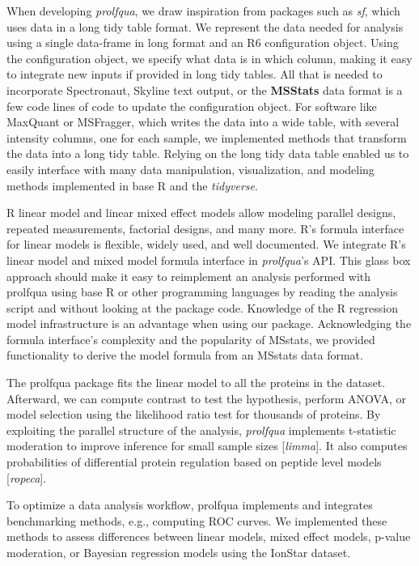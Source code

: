 \documentclass[journal=jacsat,manuscript=article]{achemso}
\begin{document}
When developing \emph{prolfqua}, we draw inspiration from packages such
as \emph{sf}, which uses data in a long tidy table format. We represent
the data needed for analysis using a single data-frame in long format
and an R6 configuration object. Using the configuration object, we
specify what data is in which column, making it easy to integrate new
inputs if provided in long tidy tables. All that is needed to
incorporate Spectronaut, Skyline text output, or the \textbf{MSStats}
data format is a few code lines of code to update the configuration
object. For software like MaxQuant or MSFragger, which writes the data
into a wide table, with several intensity columns, one for each sample,
we implemented methods that transform the data into a long tidy table.
Relying on the long tidy data table enabled us to easily interface with
many data manipulation, visualization, and modeling methods implemented
in base R and the \emph{tidyverse}.

R linear model and linear mixed effect models allow modeling parallel
designs, repeated measurements, factorial designs, and many more. R's
formula interface for linear models is flexible, widely used, and well
documented. We integrate R's linear model and mixed model formula
interface in \emph{prolfqua}'s API. This glass box approach should make
it easy to reimplement an analysis performed with prolfqua using base R
or other programming languages by reading the analysis script and
without looking at the package code. Knowledge of the R regression model
infrastructure is an advantage when using our package. Acknowledging the
formula interface's complexity and the popularity of MSstats, we
provided functionality to derive the model formula from an MSstats data
format.

The prolfqua package fits the linear model to all the proteins in the
dataset. Afterward, we can compute contrast to test the hypothesis,
perform ANOVA, or model selection using the likelihood ratio test for
thousands of proteins. By exploiting the parallel structure of the
analysis, \emph{prolfqua} implements t-statistic moderation to improve
inference for small sample sizes {[}\emph{limma}{]}. It also computes
probabilities of differential protein regulation based on peptide level
models {[}\emph{ropeca}{]}.

To optimize a data analysis workflow, prolfqua implements and integrates
benchmarking methods, e.g., computing ROC curves. We implemented these
methods to assess differences between linear models, mixed effect
models, p-value moderation, or Bayesian regression models using the
IonStar dataset.
\end{document}
